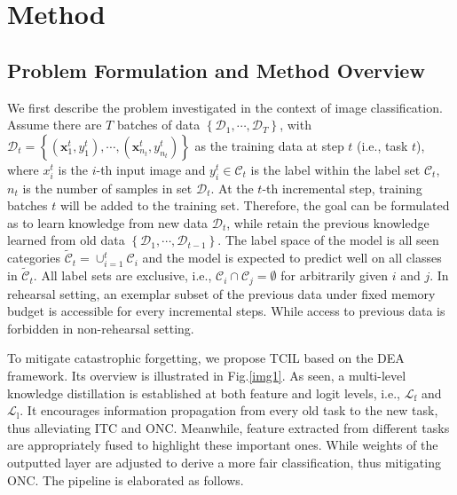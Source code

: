 \documentclass[letterpaper]{article} %
\begin{document}
\section{Method}

\subsection{Problem Formulation and Method Overview}
We first describe the problem investigated in the context of image classification. Assume there are $T$ batches of data $\left\{\mathcal{D}_{1}, \cdots, \mathcal{D}_{T}\right\}$, with $\mathcal{D}_{t}=\left\{\left(\mathbf{x}_{1}^{t}, y_{1}^{t}\right), \cdots,\left(\mathbf{x}_{n_{t}}^{t}, y_{n_{t}}^{t}\right)\right\}$ as the training data at step $t$ (i.e., task $t$), where ${x}_{i}^{t}$ is the $i$-th input image and $y_{i}^{t} \in \mathcal{C}_{t}$ is the label within the label set $\mathcal{C}_{t}$, $n_{t}$ is the number of samples in set $\mathcal{D}_{t}$. At the $t$-th incremental step, training batches $t$ will be added to the training set. Therefore, the goal can be formulated as to learn knowledge from new data $\mathcal{D}_{t}$, while retain the previous knowledge learned from old data $\left\{\mathcal{D}_{1}, \cdots, \mathcal{D}_{t-1}\right\}$. The label space of the model is all seen categories $\tilde{\mathcal{C}}_{t}=\cup_{i=1}^{t} \mathcal{C}_{i}$ and the model is expected to predict well on all classes in $\tilde{\mathcal{C}}_{t}$. All label sets are exclusive, i.e., $\mathcal{C}_{i} \cap \mathcal{C}_{j}=\emptyset$ for arbitrarily given $i$ and $j$. In rehearsal setting, an exemplar subset of the previous data under fixed memory budget is accessible for every incremental steps. While access to previous data is forbidden in non-rehearsal setting.

To mitigate catastrophic forgetting, we propose TCIL based on the DEA framework. Its overview is illustrated in Fig.\ref{img1}. As seen, a multi-level knowledge distillation is established at both feature and logit levels, i.e., $\mathcal{L}_{\mathrm{f}}$ and $\mathcal{L}_{\mathrm{l}}$. It encourages information propagation from every old task to the new task, thus alleviating ITC and ONC. Meanwhile, feature extracted from different tasks are appropriately fused to highlight these important ones. While weights of the outputted layer are adjusted to derive a more fair classification, thus mitigating ONC. The pipeline is elaborated as follows.
\end{document}
